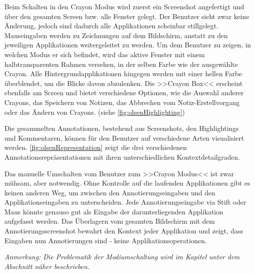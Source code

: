 \medskip Beim Schalten in den Crayon Modus wird zuerst ein Screenshot angefertigt und über den gesamten Screen bzw. alle Fenster gelegt. Der Benutzer sieht zwar keine Änderung, jedoch sind dadurch alle Applikationen scheinbar stillgelegt. Mauseingaben werden zu Zeichnungen auf dem Bildschirm, anstatt zu den jeweiligen Applikationen weitergeleitet zu werden. Um dem Benutzer zu zeigen, in welchen Modus er sich befindet,  wird das aktive Fenster mit einem halbtransparenten Rahmen versehen, in der selben Farbe wie der ausgewählte Crayon. Alle Hintergrundapplikationen hingegen werden mit einer hellen Farbe überblendet, um die Blicke davon abzulenken. Die >>Crayon Box<< erscheint ebenfalls am Screen und bietet verschiedene Optionen, wie die Auswahl anderer Crayons, das Speichern von Notizen, das Abbrechen vom Notiz-Erstellvorgang oder das Ändern von Crayons. (siehe \autoref{fig:olsenHighlighting})

\medskip Die gesammelten Annotationen, bestehend aus Screenshots, den Highlightings und Kommentaren, können für den Benutzer auf verschiedene Arten visualisiert werden. \autoref{fig:olsenRepresentation} zeigt die drei verschiedenen Annotationsrepräsentationen mit ihren unterschiedlichen Kontextdetailgraden.

\medskip Das manuelle Umschalten vom Benutzer  zum >>Crayon Modus<< ist zwar mühsam, aber notwendig. Ohne Kontrolle auf die laufenden Applikationen gibt es keinen anderen Weg, um zwischen den Annotierungseingaben und den Applikationseingaben zu unterscheiden. Jede Annotierungseingabe via Stift oder Maus könnte genauso gut als Eingabe der darunterliegenden Applikation aufgefasst werden. Das Überlagern vom gesamten Bildschirm mit dem Annotierungsscreenshot bewahrt den Kontext jeder Applikation und zeigt, dass Eingaben nun Annotierungen sind - keine Applikationsoperationen.

\bigskip \emph{Anmerkung: \graffito{\(\clubsuit\)}Die Problematik der Modiumschaltung wird im Kapitel  unter dem Abschnitt  näher beschrieben.}

